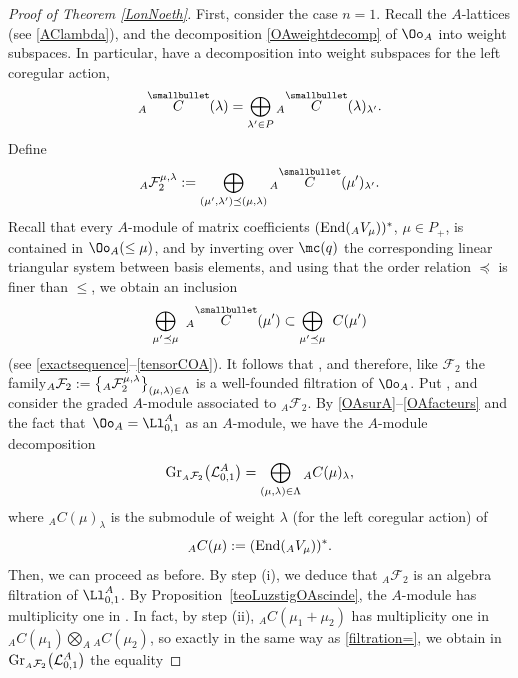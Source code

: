 \begin{proof}[Proof of Theorem \ref{LonNoeth}]
First, consider the case $n=1$. Recall the $A$-lattices  (see \eqref{AClambda}), and the decomposition \eqref{OAweightdecomp} of $\Oo_A$ into weight subspaces. In particular, have a decomposition into weight subspaces for the left coregular action,
\[{}_A \overset{\raisebox{-1.5pt}{\scriptsize$\smallbullet$}}{C} (\lambda) = \bigoplus_{\lambda'\in P} {}_A \overset{\raisebox{-1.5pt}{\scriptsize$\smallbullet$}}{C} (\lambda)_{\lambda'}.\]
Define
\[{}_A\mathcal{F}_2^{\mu,\lambda} := \bigoplus_{(\mu',\lambda')\preceq (\mu,\lambda)} {}_A \overset{\raisebox{-1.5pt}{\scriptsize$\smallbullet$}}{C} (\mu')_{\lambda'}.\]
Recall that every $A$-module of matrix coefficients $({\rm End}({}_A V_\mu))^*$, $\mu\in P_+$, is contained in $\Oo_A(\leq \mu)$, and by inverting over $\mc(q)$ the corresponding linear triangular system between basis elements, and using that the order relation $\preceq$ is finer than $\leq$, we obtain an inclusion
\[
 \bigoplus_{\mu'\preceq \mu}\ {}_A \overset{\raisebox{-1.5pt}{\scriptsize$\smallbullet$}}{C} (\mu') \subset \bigoplus_{\mu'\preceq \mu} \ C(\mu')
\]
 (see \eqref{exactsequence}--\eqref{tensorCOA}). It follows that , and therefore, like $\mathcal{F}_2$ the family${}_A\mathcal{F}_2 :=\smash{\big\{{}_A\mathcal{F}_2^{\mu,\lambda}\big\}_{(\mu,\lambda)\in \Lambda}}$ is a well-founded filtration of $\Oo_A$. Put , and consider the graded $A$-module  associated to ${}_A\mathcal{F}_2$. By \eqref{OAsurA}--\eqref{OAfacteurs} and the fact that~${\Oo_A=\Ll_{0,1}^A}$ as an $A$-module, we have the $A$-module decomposition
\[{\rm Gr}_{ {}_A\mathcal{F}_2}\big({\mathcal L}_{0,1}^A\big)=\bigoplus_{(\mu,\lambda)\in \Lambda} {}_AC(\mu)_\lambda,\]
where ${}_AC(\mu)_\lambda$ is the submodule of weight $\lambda$ (for the left coregular action) of
\[{}_AC(\mu) := \left({\rm End}({}_A V_\mu\right))^*.\]
Then, we can proceed as before. By step (i), we deduce that ${}_A\mathcal{F}_2$ is an algebra filtration of $\Ll_{0,1}^A$. By Proposition~\ref{teoLuzstigOAscinde}, the $A$-module  has multiplicity one in . In fact, by step (ii), ${}_AC(\mu_1+\mu_2)$ has multiplicity one in ${}_AC(\mu_1) \bigotimes_A {}_AC(\mu_2)$, so exactly in the same way as \eqref{filtration=}, we obtain in ${\rm Gr}_{ {}_A\mathcal{F}_2}\big({\mathcal L}_{0,1}^A\big)$ the equality

\end{proof}
